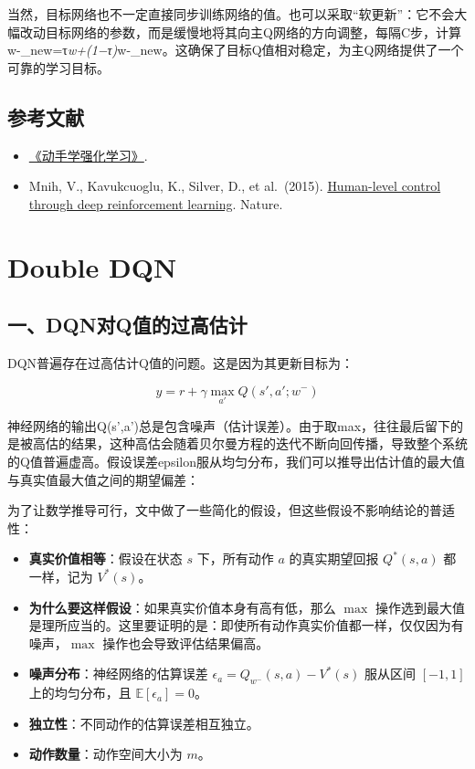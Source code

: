 当然，目标网络也不一定直接同步训练网络的值。也可以采取``软更新''：它不会大幅改动目标网络的参数，而是缓慢地将其向主Q网络的方向调整，每隔C步，计算w-\_new=τ\emph{w+(1−τ)}w-\_new。这确保了目标Q值相对稳定，为主Q网络提供了一个可靠的学习目标。

\hypertarget{ux53c2ux8003ux6587ux732e-48}{%
\subsection{参考文献}\label{ux53c2ux8003ux6587ux732e-48}}

\begin{itemize}
\tightlist
\item
  \href{https://hrl.boyuai.com/}{《动手学强化学习》}.
\item
  Mnih, V., Kavukcuoglu, K., Silver, D., et al.~(2015). \href{https://www.nature.com/articles/nature14236}{Human-level control through deep reinforcement learning}. Nature.
\end{itemize}

\clearpage

\hypertarget{double-dqn}{%
\section{Double DQN}\label{double-dqn}}

\hypertarget{ux4e00dqnux5bf9qux503cux7684ux8fc7ux9ad8ux4f30ux8ba1}{%
\subsection{一、DQN对Q值的过高估计}\label{ux4e00dqnux5bf9qux503cux7684ux8fc7ux9ad8ux4f30ux8ba1}}

DQN普遍存在过高估计Q值的问题。这是因为其更新目标为：

\[
y=r+\gamma\max_{a'}Q(s',a';w^{-})
\]

神经网络的输出Q(s',a')总是包含噪声（估计误差）。由于取max，往往最后留下的是被高估的结果，这种高估会随着贝尔曼方程的迭代不断向回传播，导致整个系统的Q值普遍虚高。假设误差epsilon服从均匀分布，我们可以推导出估计值的最大值与真实值最大值之间的期望偏差：

为了让数学推导可行，文中做了一些简化的假设，但这些假设不影响结论的普适性：

\begin{itemize}
\tightlist
\item
  \textbf{真实价值相等}：假设在状态 \(s\) 下，所有动作 \(a\) 的真实期望回报 \(Q^{*}(s,a)\) 都一样，记为 \(V^{*}(s)\)。
\item
  \textbf{为什么要这样假设}：如果真实价值本身有高有低，那么 \(\max\) 操作选到最大值是理所应当的。这里要证明的是：即使所有动作真实价值都一样，仅仅因为有噪声，\(\max\) 操作也会导致评估结果偏高。
\item
  \textbf{噪声分布}：神经网络的估算误差 \(\epsilon_a=Q_{w^{-}}(s,a)-V^{*}(s)\) 服从区间 \([-1,1]\) 上的均匀分布，且 \(\mathbb{E}[\epsilon_a]=0\)。
\item
  \textbf{独立性}：不同动作的估算误差相互独立。
\item
  \textbf{动作数量}：动作空间大小为 \(m\)。
\end{itemize}

